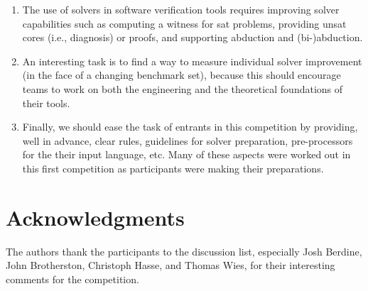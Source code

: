 \documentclass[twoside,11pt]{article}
\begin{document}
\begin{enumerate}
\item The use of solvers in software verification tools requires improving solver capabilities such as
computing a witness for sat problems,
providing unsat cores (i.e., diagnosis) or proofs,
and supporting abduction and (bi-)abduction.

\item An interesting task is to find a way to measure individual solver improvement (in the face of a changing benchmark set), because this should encourage teams to work on both the engineering and the theoretical foundations of their tools.
% 

\item Finally, we should ease the task of entrants in this competition by providing, well in advance, clear rules, guidelines for solver preparation, pre-processors for the their input language, etc. Many of these aspects were worked out in this first competition as participants were making their preparations.

\end{enumerate}


\section*{Acknowledgments}

The authors thank the participants to the discussion list, especially 
Josh Berdine, John Brotherston, Christoph Hasse, and Thomas Wies, 
for their interesting comments for the competition.





\end{document}
